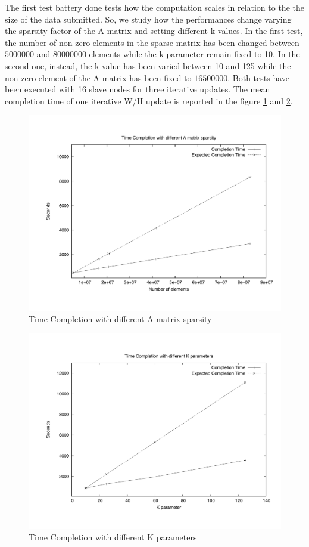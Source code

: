 The first test battery done tests how the computation scales in relation to the the size of the data submitted. So, we study how the performances change varying the sparsity factor of the A matrix and setting different k values. In the first test, the number of non-zero elements in the sparse matrix has been changed between $5000000$ and $80000000$ elements while the k parameter remain fixed to 10. In the second one, instead, the k value has been varied between 10 and 125 while the non zero element of the A matrix has been fixed to $16500000$.  Both tests have been executed with 16 slave nodes for three iterative updates. The mean completion time of one iterative W/H update is reported in the figure \ref{DeltaVar}  and \ref{kVar}. 


\begin{figure}[th]
	\centerline{
		\mbox{\includegraphics[scale=0.48]{HadoopTest/PsFiles/DeltaVar.pdf}}
	}
	\caption{Time Completion with different A matrix sparsity} 
        \label{DeltaVar}
\end{figure}

\begin{figure}[th]
	\centerline{
		\mbox{\includegraphics[scale=0.48]{HadoopTest/PsFiles/kVar.pdf}}
	}
	\caption{Time Completion with different K parameters} 
        \label{kVar}
\end{figure}



